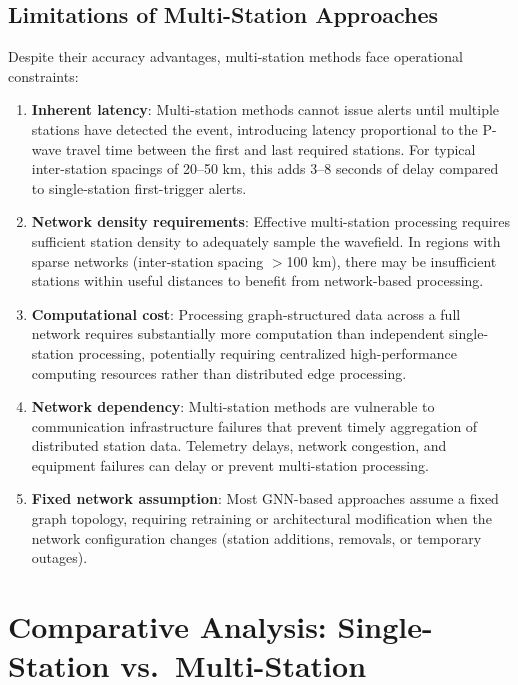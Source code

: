 \documentclass[review,authoryear]{elsarticle}
\begin{document}
\subsection{Limitations of Multi-Station Approaches}

Despite their accuracy advantages, multi-station methods face operational constraints:

\begin{enumerate}
\item \textbf{Inherent latency}: Multi-station methods cannot issue alerts until multiple stations have detected the event, introducing latency proportional to the P-wave travel time between the first and last required stations. For typical inter-station spacings of 20--50 km, this adds 3--8 seconds of delay compared to single-station first-trigger alerts.

\item \textbf{Network density requirements}: Effective multi-station processing requires sufficient station density to adequately sample the wavefield. In regions with sparse networks (inter-station spacing $>$100 km), there may be insufficient stations within useful distances to benefit from network-based processing.

\item \textbf{Computational cost}: Processing graph-structured data across a full network requires substantially more computation than independent single-station processing, potentially requiring centralized high-performance computing resources rather than distributed edge processing.

\item \textbf{Network dependency}: Multi-station methods are vulnerable to communication infrastructure failures that prevent timely aggregation of distributed station data. Telemetry delays, network congestion, and equipment failures can delay or prevent multi-station processing.

\item \textbf{Fixed network assumption}: Most GNN-based approaches assume a fixed graph topology, requiring retraining or architectural modification when the network configuration changes (station additions, removals, or temporary outages).
\end{enumerate}


\section{Comparative Analysis: Single-Station vs.\ Multi-Station}
\label{sec:comparative}
\end{document}
